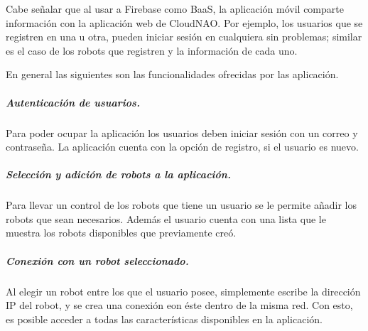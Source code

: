 Cabe señalar que al usar a Firebase como BaaS, la aplicación móvil
comparte información con la aplicación web de CloudNAO. Por ejemplo, los
usuarios que se registren en una u otra, pueden iniciar sesión en cualquiera
sin problemas; similar es el caso de los robots que registren y la información
de cada uno.

En general las siguientes son las funcionalidades ofrecidas por las aplicación.


\subparagraph{Autenticación de usuarios.}
\label{\detokenize{users_docs:autenticacion-de-usuarios}}
Para poder ocupar la aplicación los usuarios deben iniciar sesión con un correo
y contraseña. La aplicación cuenta con la opción de registro, si el usuario
es nuevo.


\begin{figure}[!h]
    \centering
    \qquad
    \qquad
\end{figure}

\subparagraph{Selección y adición de robots a la aplicación.}
\label{\detokenize{users_docs:los-usuarios-pueden-anadir-nuevos-robots}}
Para llevar un control de los robots que tiene un usuario se le permite añadir
los robots que sean necesarios.
Además el usuario cuenta con una lista que le muestra los robots disponibles
que previamente creó.

\begin{figure}[!h]
    \centering
    \qquad
    \qquad
\end{figure}



\subparagraph{Conexión con un robot seleccionado.}
\label{\detokenize{users_docs:conexion-con-un-robot-seleccionado}}
Al elegir un robot entre los que el usuario posee, simplemente escribe la
dirección IP del robot, y se crea una conexión eon éste dentro de la misma
red. Con esto, es posible acceder a todas las características disponibles en la
aplicación.


\begin{figure}[!h]
    \centering
    \qquad

\end{figure}


